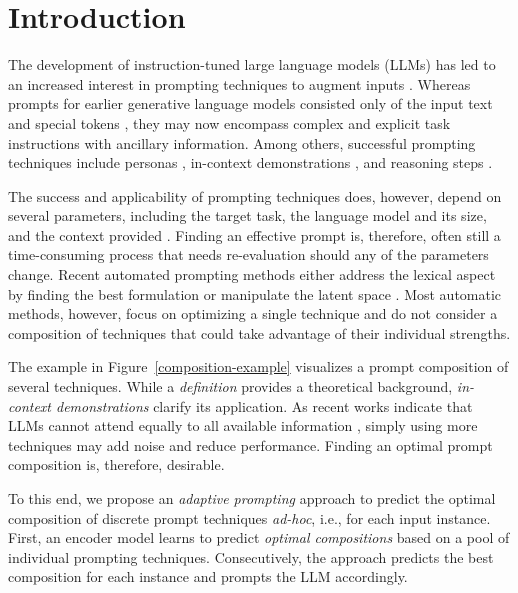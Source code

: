 \section{Introduction}
\label{sec:introduction}

The development of instruction-tuned large language models (LLMs) has led to an increased interest in prompting techniques to augment inputs \cite{tian2024}. Whereas prompts for earlier generative language models consisted only of the input text and special tokens \cite{radford2018,raffel2020}, they may now encompass complex and explicit task instructions with ancillary information. Among others, successful prompting techniques include personas \cite{liu2024}, in-context demonstrations \cite{liu2023,dong2024}, and reasoning steps \cite{wei2022}.



The success and applicability of prompting techniques does, however, depend on several parameters, including the target task, the language model and its size, %
and the context provided \cite{brown2020,schick2021,mosbach2023,dong2024,arroyo2024}.
Finding an effective prompt is, therefore, often still a time-consuming process that needs re-evaluation should any of the parameters change. Recent automated prompting methods either address the lexical aspect by finding the best formulation \cite{honovich2023} or manipulate the latent space \cite{liu2022a}. Most automatic methods, however, focus on optimizing a single technique and do not consider a composition of techniques that could take advantage of their individual strengths.

The example in Figure~\ref{composition-example} visualizes a prompt composition of several techniques. While a \emph{definition} provides a theoretical background, \emph{in-context demonstrations} clarify its application. As recent works indicate that LLMs cannot attend equally to all available information \cite{liu2024a,plepi2024}, simply using more techniques may add noise and reduce performance. Finding an optimal prompt composition is, therefore, desirable.

To this end, we propose an \textit{adaptive prompting} approach to predict the optimal composition of discrete prompt techniques \emph{ad-hoc}, i.e., for each input instance. First, an encoder model learns to predict \textit{optimal compositions} based on a pool of individual prompting techniques. Consecutively, the approach predicts the best composition for each instance and prompts the LLM accordingly.

